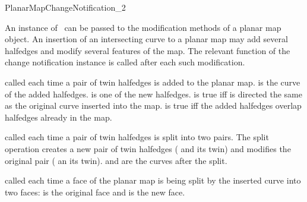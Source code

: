 
\ccRefPageBegin

\begin{ccRefConcept}{PlanarMapChangeNotification_2}

\ccDefinition
   An instance of \ccRefName\ can be passed to the modification
   methods of a planar map object. An insertion of an intersecting
   curve to a planar map may add several halfedges and modify several
   features of the map. The relevant function of the change
   notification instance is called after each such modification.

\ccOperations


  {called each time a pair of twin halfedges is added to the planar map.
   is the curve of the added halfedges.
   is one of the new halfedges.
   is true iff  is directed the same as the
  original curve inserted into the map.
   is true iff the added halfedges overlap halfedges already in the
  map.}

  {called each time a pair of twin halfedges is split into two
  pairs. The split operation creates a new pair of twin halfedges
  ( and its twin) and modifies the original
  pair ( an its twin).
   and  are the curves after the split.
  }

  {called each time a face of the planar map is being split by
  the inserted curve into two faces:  is the
  original face and  is the new face.
  }


\end{ccRefConcept}
